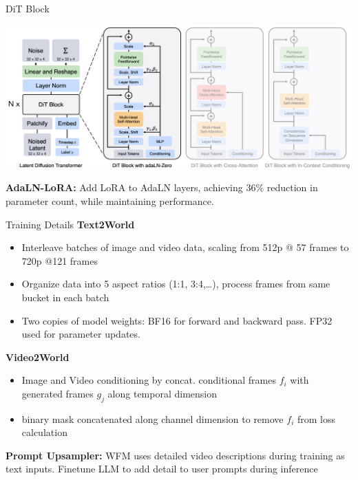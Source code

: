 \documentclass{beamer}
\begin{document}
\begin{frame}{DiT Block}
	\begin{center}
            \includegraphics[width=1.0\textwidth]{./img/diff_arch_final.png}
	\end{center}
    \textbf{AdaLN-LoRA:}\newline
    Add LoRA to AdaLN layers, achieving 36\% reduction in parameter count, while maintaining performance.
\end{frame}

\begin{frame}{Training Details}
    \textbf{Text2World}
    \begin{itemize}[label=-]
        \item Interleave batches of image and video data, scaling from 512p @ 57 frames to 720p @121 frames
        \item Organize data into 5 aspect ratios (1:1, 3:4,\dots), process frames from same bucket in each batch
        \item Two copies of model weights: BF16 for forward and backward pass. FP32 used for parameter updates.
   \end{itemize}
    \textbf{Video2World}
    \begin{itemize}[label=-]
        \item Image and Video conditioning by concat. conditional frames $f_i$ with generated frames $g_j$ along temporal dimension
        \item binary mask concatenated along channel dimension to remove $f_i$ from loss calculation
   \end{itemize}
   \textbf{Prompt Upsampler:}\newline
   WFM uses detailed video descriptions during training as text inputs. \newline 
   Finetune LLM to add detail to user prompts during inference
\end{frame}
\end{document}
